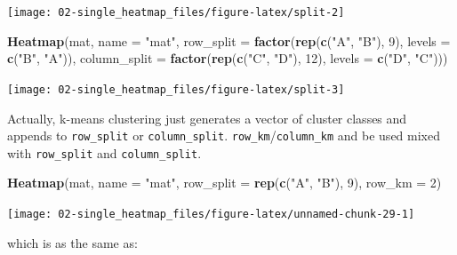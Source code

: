 \documentclass[]{book}
\newenvironment{Shaded}{\begin{snugshade}}{\end{snugshade}}
\newcommand{\KeywordTok}[1]{\textcolor[rgb]{0.13,0.29,0.53}{\textbf{#1}}}
\newcommand{\DataTypeTok}[1]{\textcolor[rgb]{0.13,0.29,0.53}{#1}}
\newcommand{\DecValTok}[1]{\textcolor[rgb]{0.00,0.00,0.81}{#1}}
\newcommand{\StringTok}[1]{\textcolor[rgb]{0.31,0.60,0.02}{#1}}
\newcommand{\NormalTok}[1]{#1}
\theoremstyle{definition}
\theoremstyle{definition}
\theoremstyle{definition}
\theoremstyle{remark}
\begin{document}
\begin{center}\texttt{[image: 02-single\_heatmap\_files/figure-latex/split-2]} \end{center}

\begin{Shaded}
\begin{Highlighting}[]
\KeywordTok{Heatmap}\NormalTok{(mat, }\DataTypeTok{name =} \StringTok{"mat"}\NormalTok{, }\DataTypeTok{row_split =} \KeywordTok{factor}\NormalTok{(}\KeywordTok{rep}\NormalTok{(}\KeywordTok{c}\NormalTok{(}\StringTok{"A"}\NormalTok{, }\StringTok{"B"}\NormalTok{), }\DecValTok{9}\NormalTok{), }\DataTypeTok{levels =} \KeywordTok{c}\NormalTok{(}\StringTok{"B"}\NormalTok{, }\StringTok{"A"}\NormalTok{)),}
    \DataTypeTok{column_split =} \KeywordTok{factor}\NormalTok{(}\KeywordTok{rep}\NormalTok{(}\KeywordTok{c}\NormalTok{(}\StringTok{"C"}\NormalTok{, }\StringTok{"D"}\NormalTok{), }\DecValTok{12}\NormalTok{), }\DataTypeTok{levels =} \KeywordTok{c}\NormalTok{(}\StringTok{"D"}\NormalTok{, }\StringTok{"C"}\NormalTok{)))}
\end{Highlighting}
\end{Shaded}

\begin{center}\texttt{[image: 02-single\_heatmap\_files/figure-latex/split-3]} \end{center}

Actually, k-means clustering just generates a vector of cluster classes
and appends to \texttt{row\_split} or \texttt{column\_split}.
\texttt{row\_km}/\texttt{column\_km} and be used mixed with
\texttt{row\_split} and \texttt{column\_split}.

\begin{Shaded}
\begin{Highlighting}[]
\KeywordTok{Heatmap}\NormalTok{(mat, }\DataTypeTok{name =} \StringTok{"mat"}\NormalTok{, }\DataTypeTok{row_split =} \KeywordTok{rep}\NormalTok{(}\KeywordTok{c}\NormalTok{(}\StringTok{"A"}\NormalTok{, }\StringTok{"B"}\NormalTok{), }\DecValTok{9}\NormalTok{), }\DataTypeTok{row_km =} \DecValTok{2}\NormalTok{)}
\end{Highlighting}
\end{Shaded}

\begin{center}\texttt{[image: 02-single\_heatmap\_files/figure-latex/unnamed-chunk-29-1]} \end{center}

which is as the same as:
\end{document}
